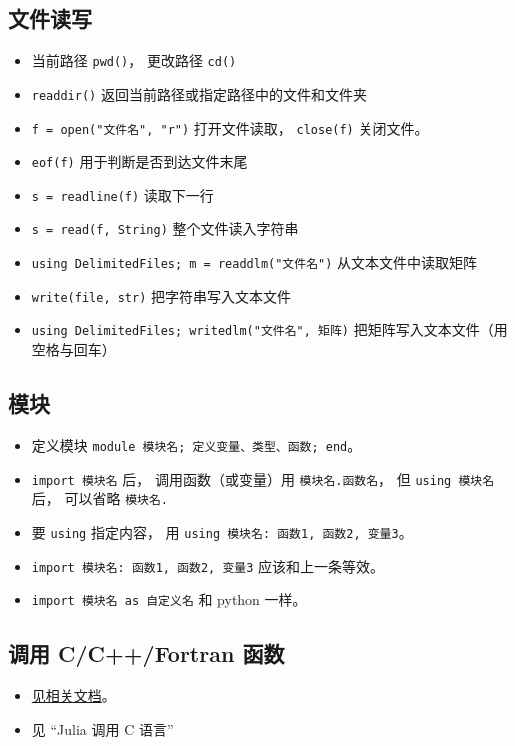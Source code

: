 \subsection{文件读写}
\begin{itemize}
\item 当前路径 \verb|pwd()|， 更改路径 \verb|cd()|
\item \verb|readdir()| 返回当前路径或指定路径中的文件和文件夹
\item \verb|f = open("文件名", "r")| 打开文件读取， \verb|close(f)| 关闭文件。
\item \verb|eof(f)| 用于判断是否到达文件末尾
\item \verb|s = readline(f)| 读取下一行
\item \verb|s = read(f, String)| 整个文件读入字符串
\item \verb|using DelimitedFiles; m = readdlm("文件名")| 从文本文件中读取矩阵
\item \verb|write(file, str)| 把字符串写入文本文件
\item \verb|using DelimitedFiles; writedlm("文件名", 矩阵)| 把矩阵写入文本文件（用空格与回车）
\end{itemize}

\subsection{模块}
\begin{itemize}
\item 定义模块 \verb|module 模块名; 定义变量、类型、函数; end|。
\item \verb|import 模块名| 后， 调用函数（或变量）用 \verb|模块名.函数名|， 但 \verb|using 模块名| 后， 可以省略 \verb|模块名.|
\item 要 \verb|using| 指定内容， 用 \verb|using 模块名: 函数1, 函数2, 变量3|。
\item \verb|import 模块名: 函数1, 函数2, 变量3| 应该和上一条等效。
\item \verb|import 模块名 as 自定义名| 和 python 一样。
\end{itemize}

\subsection{调用 C/C++/Fortran 函数}
\begin{itemize}
\item \href{https://docs.julialang.org/en/v1/manual/calling-c-and-fortran-code/}{见相关文档}。
\item 见 “Julia 调用 C 语言”
\end{itemize}

